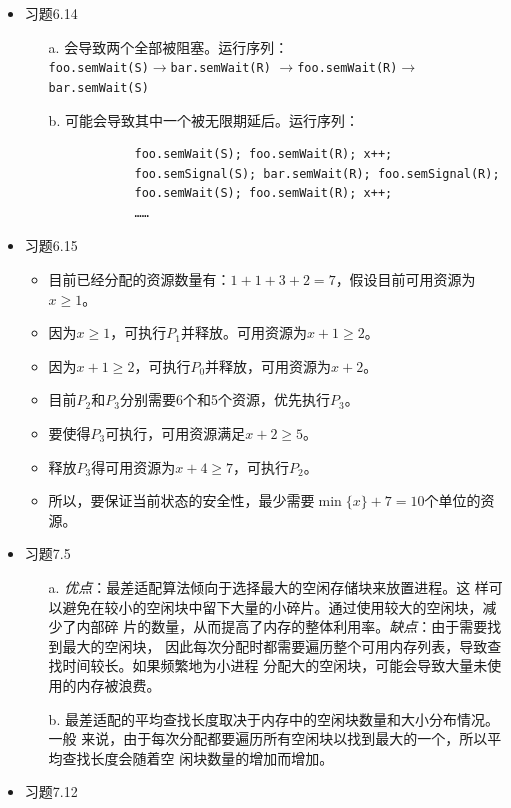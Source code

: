 \documentclass[b5paper, twoside]{article}
\let\oldemph\emph
\renewcommand{\emph}[1]{{\oldemph{#1}}}
\begin{document}
\begin{itemize}
	\item 习题6.14
	\begin{itemize}
		\item[a. ] 
		会导致两个全部被阻塞。运行序列：\\\lstinline|foo.semWait(S)|$\rightarrow$\lstinline|bar.semWait(R)|
		$\rightarrow$\lstinline|foo.semWait(R)|$\rightarrow$\lstinline|bar.semWait(S)|
		\item[b. ] 可能会导致其中一个被无限期延后。运行序列：
		\begin{verbatim}
			foo.semWait(S); foo.semWait(R); x++;
			foo.semSignal(S); bar.semWait(R); foo.semSignal(R);
			foo.semWait(S); foo.semWait(R); x++;
			……
		\end{verbatim}
	\end{itemize}
	\item 习题6.15
	\begin{itemize}
		\item 目前已经分配的资源数量有：$1+1+3+2=7$，假设目前可用资源为$x\geq1$。
		\item 因为$x\geq1$，可执行$P_1$并释放。可用资源为$x+1\geq2$。
		\item 因为$x+1\geq2$，可执行$P_0$并释放，可用资源为$x+2$。
		\item 目前$P_2$和$P_3$分别需要6个和5个资源，优先执行$P_3$。
		\item 要使得$P_3$可执行，可用资源满足$x+2\geq5$。
		\item 释放$P_3$得可用资源为$x+4\geq7$，可执行$P_2$。
		\item 所以，要保证当前状态的安全性，最少需要$\min\{x\}+7=10$个单位的资源。
	\end{itemize}
	\item 习题7.5
	\begin{itemize}
		\item[a. ] \emph{优点}：最差适配算法倾向于选择最大的空闲存储块来放置进程。这
		样可以避免在较小的空闲块中留下大量的小碎片。通过使用较大的空闲块，减少了内部碎
		片的数量，从而提高了内存的整体利用率。\emph{缺点}：由于需要找到最大的空闲块，
		因此每次分配时都需要遍历整个可用内存列表，导致查找时间较长。如果频繁地为小进程
		分配大的空闲块，可能会导致大量未使用的内存被浪费。
		\item[b. ] 最差适配的平均查找长度取决于内存中的空闲块数量和大小分布情况。一般
		来说，由于每次分配都要遍历所有空闲块以找到最大的一个，所以平均查找长度会随着空
		闲块数量的增加而增加。
	\end{itemize}
	\item 习题7.12
	\begin{itemize}

\end{itemize}
\end{itemize}
\end{document}
